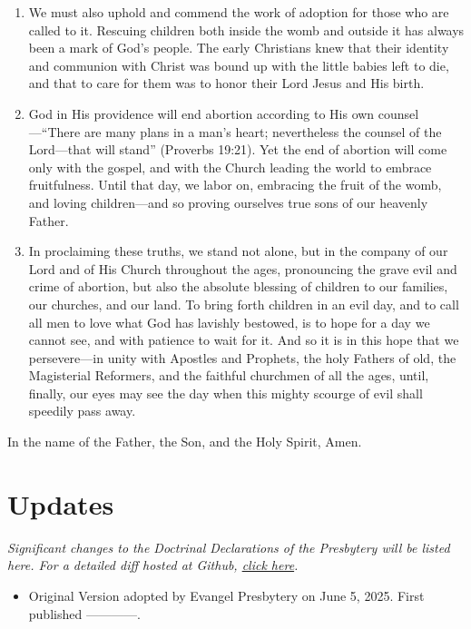 \documentclass[
]{book}
\providecommand{\tightlist}{%
  \setlength{\itemsep}{0pt}\setlength{\parskip}{0pt}}
\begin{document}
\begin{enumerate}
\item
  We must also uphold and commend the work of adoption for those who are called to it. Rescuing children both inside the womb and outside it has always been a mark of God's people. The early Christians knew that their identity and communion with Christ was bound up with the little babies left to die, and that to care for them was to honor their Lord Jesus and His birth.
\item
  God in His providence will end abortion according to His own counsel---``There are many plans in a man's heart; nevertheless the counsel of the Lord---that will stand'' (Proverbs 19:21). Yet the end of abortion will come only with the gospel, and with the Church leading the world to embrace fruitfulness. Until that day, we labor on, embracing the fruit of the womb, and loving children---and so proving ourselves true sons of our heavenly Father.
\item
  In proclaiming these truths, we stand not alone, but in the company of our Lord and of His Church throughout the ages, pronouncing the grave evil and crime of abortion, but also the absolute blessing of children to our families, our churches, and our land. To bring forth children in an evil day, and to call all men to love what God has lavishly bestowed, is to hope for a day we cannot see, and with patience to wait for it. And so it is in this hope that we persevere---in unity with Apostles and Prophets, the holy Fathers of old, the Magisterial Reformers, and the faithful churchmen of all the ages, until, finally, our eyes may see the day when this mighty scourge of evil shall speedily pass away.
\end{enumerate}

In the name of the Father, the Son, and the Holy Spirit, Amen.

\hypertarget{updates}{%
\chapter*{Updates}\label{updates}}

\emph{Significant changes to the Doctrinal Declarations of the Presbytery will be listed here. For a detailed diff hosted at Github, \href{https://github.com/Evangel-Presbytery/evangel-ddp}{click here}.}

\begin{itemize}
\tightlist
\item
  Original Version adopted by Evangel Presbytery on June 5, 2025. First published ------------.
\end{itemize}
\end{document}
